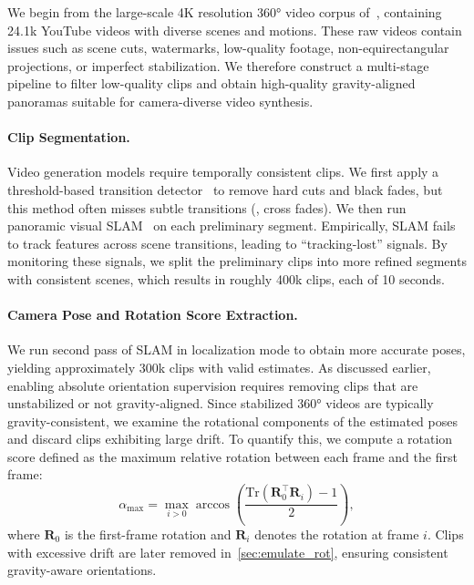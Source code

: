 We begin from the large-scale 4K resolution 360° video corpus of~\cite{wallingford2024image}, containing 24.1k YouTube videos with diverse scenes and motions.  
These raw videos contain issues such as scene cuts, watermarks, low-quality footage, non-equirectangular projections, or imperfect stabilization.
We therefore construct a multi-stage pipeline to filter low-quality clips and obtain high-quality gravity-aligned panoramas suitable for camera-diverse video synthesis.

\paragraph{Clip Segmentation.}
Video generation models require temporally consistent clips.  
We first apply a threshold-based transition detector~\cite{scenedetect2024} to remove hard cuts and black fades, but this method often misses subtle transitions (\eg, cross fades).  
We then run panoramic visual SLAM~\cite{sumikura2019openvslam} on each preliminary segment.  
Empirically, SLAM fails to track features across scene transitions, leading to ``tracking-lost'' signals.
By monitoring these signals, we split the preliminary clips into more refined segments with consistent scenes, which results in roughly 400k clips, each of 10 seconds.

\paragraph{Camera Pose and Rotation Score Extraction.}
We run second pass of SLAM in localization mode to obtain more accurate poses, yielding approximately 300k clips with valid estimates.
As discussed earlier, enabling absolute orientation supervision requires removing clips that are unstabilized or not gravity-aligned.  
Since stabilized 360° videos are typically gravity-consistent, we examine the rotational components of the estimated poses and discard clips exhibiting large drift.
To quantify this, we compute a rotation score defined as the maximum relative rotation between each frame and the first frame:
\begin{equation}
    \alpha_{\max}
    =
    \max_{i>0}
    \arccos\!\left(
        \frac{\mathrm{Tr}\!\left(\mathbf{R}_0^\top \mathbf{R}_i\right)-1}{2}
    \right),
\end{equation}
where $\mathbf{R}_0$ is the first-frame rotation and $\mathbf{R}_i$ denotes the rotation at frame $i$.
Clips with excessive drift are later removed in~\cref{sec:emulate_rot}, ensuring consistent gravity-aware orientations.

